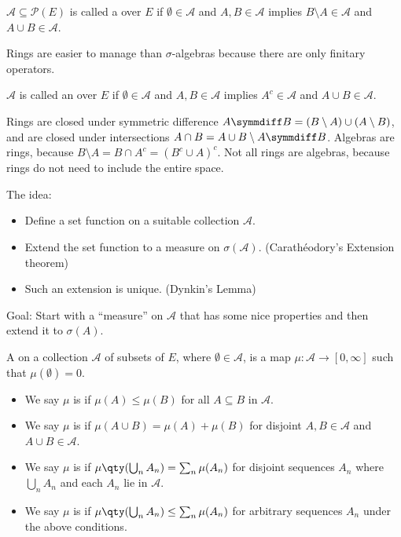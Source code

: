 \begin{definition}[Ring]
	$\mathcal A \subseteq \mathcal P(E)$ is called a  over $E$ if $\emptyset \in \mathcal A$ and $A, B \in \mathcal A$ implies $B \setminus A \in \mathcal A$ and $A \cup B \in \mathcal A$.
\end{definition}

Rings are easier to manage than $\sigma$-algebras because there are only finitary operators.

\begin{definition}[Algebra]
	$\mathcal A$ is called an  over $E$ if $\emptyset \in \mathcal A$ and $A, B \in \mathcal A$ implies $A^c \in \mathcal A$ and $A \cup B \in \mathcal A$.
\end{definition}

\begin{remark}
	Rings are closed under symmetric difference $A \symmdiff B = (B \setminus A) \cup (A \setminus B)$, and are closed under intersections $A \cap B = A \cup B \setminus A \symmdiff B$.
	Algebras are rings, because $B \setminus A = B \cap A^c = (B^c \cup A)^c$.
	Not all rings are algebras, because rings do not need to include the entire space.
\end{remark}

The idea:
\begin{itemize}
	\item Define a set function on a suitable collection $\mathcal{A}$.
	\item Extend the set function to a measure on $\sigma(\mathcal{A})$. (Carath\'eodory's Extension theorem)
	\item Such an extension is unique. (Dynkin's Lemma)
\end{itemize}

Goal: Start with a ``measure'' on $\mathcal{A}$ that has some nice properties and then extend it to $\sigma(A)$.

\begin{definition}
	A  on a collection $\mathcal A$ of subsets of $E$, where $\emptyset \in \mathcal A$, is a map $\mu \colon \mathcal A \to [0,\infty]$ such that $\mu(\emptyset) = 0$.
	\begin{itemize}
		\item We say $\mu$ is  if $\mu(A) \leq \mu(B)$ for all $A \subseteq B$ in $\mathcal A$.
		\item We say $\mu$ is  if $\mu(A \cup B) = \mu(A) + \mu(B)$ for disjoint $A, B \in \mathcal A$ and $A \cup B \in \mathcal A$.
		\item We say $\mu$ is  if $\mu\qty(\bigcup_n A_n) = \sum_n \mu(A_n)$ for disjoint sequences $A_n$ where $\bigcup_n A_n$ and each $A_n$ lie in $\mathcal A$.
		\item We say $\mu$ is  if $\mu\qty(\bigcup_n A_n) \leq \sum_n \mu(A_n)$ for arbitrary sequences $A_n$ under the above conditions.
	\end{itemize}
\end{definition}

